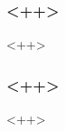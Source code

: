 
\begin{frame}[ctb!]
\footnotesize{
  \frametitle{<++>}
  <++>
}
\end{frame}

\begin{frame}[ctb!]
\footnotesize{
  \frametitle{<++>}
  <++>
}
\end{frame}
